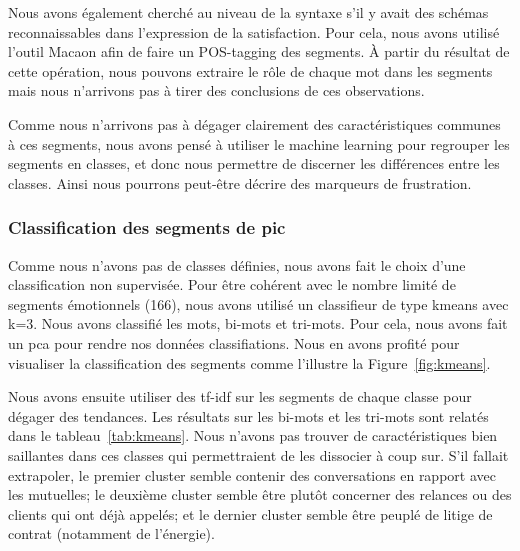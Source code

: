 

Nous avons également cherché au niveau de la syntaxe s'il y avait des schémas reconnaissables dans l'expression de la satisfaction. Pour cela, nous avons utilisé l’outil Macaon afin de faire un POS-tagging des segments. À partir du résultat de cette opération, nous pouvons extraire le rôle de chaque mot dans les segments mais nous n'arrivons pas à tirer des conclusions de ces observations. %

%

Comme nous n'arrivons pas à dégager clairement des caractéristiques communes à ces segments, nous avons pensé à utiliser le machine learning pour regrouper les segments en classes, et donc nous permettre de discerner les différences entre les classes. Ainsi nous pourrons peut-être décrire des marqueurs de frustration.

\subsubsection{Classification des segments de pic}

Comme nous n'avons pas de classes définies, nous avons fait le choix d'une classification non supervisée. Pour être cohérent avec le nombre limité de segments émotionnels (166), nous avons utilisé un classifieur de type kmeans avec k=3. Nous avons classifié les mots, bi-mots et tri-mots. Pour cela, nous avons fait un pca pour rendre nos données classifiations. Nous en avons profité pour visualiser la classification des segments comme l'illustre la Figure~\ref{fig:kmeans}.



Nous avons ensuite utiliser des tf-idf sur les segments de chaque classe pour dégager des tendances. Les résultats sur les bi-mots et les tri-mots sont relatés dans le tableau~\ref{tab:kmeans}. Nous n'avons pas trouver de caractéristiques bien saillantes dans ces classes qui permettraient de les dissocier à coup sur. S'il fallait extrapoler, le premier cluster semble contenir des conversations en rapport avec les mutuelles; le deuxième cluster semble être plutôt concerner des relances ou des clients qui ont déjà appelés; et le dernier cluster semble être peuplé de litige de contrat (notamment de l'énergie).

